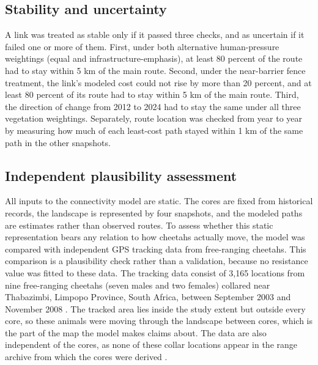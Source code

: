 \subsection{Stability and uncertainty}
\label{sec:uncertainty}

A link was treated as stable only if it passed three checks, and as uncertain if it failed one or more of them. First, under both alternative human-pressure weightings (equal and infrastructure-emphasis), at least 80 percent of the route had to stay within 5 km of the main route. Second, under the near-barrier fence treatment, the link's modeled cost could not rise by more than 20 percent, and at least 80 percent of its route had to stay within 5 km of the main route. Third, the direction of change from 2012 to 2024 had to stay the same under all three vegetation weightings. Separately, route location was checked from year to year by measuring how much of each least-cost path stayed within 1 km of the same path in the other snapshots.

\subsection{Independent plausibility assessment}
\label{sec:validation}

All inputs to the connectivity model are static. The cores are fixed from historical records, the landscape is represented by four snapshots, and the modeled paths are estimates rather than observed routes. To assess whether this static representation bears any relation to how cheetahs actually move, the model was compared with independent GPS tracking data from free-ranging cheetahs. This comparison is a plausibility check rather than a validation, because no resistance value was fitted to these data. The tracking data consist of 3,165 locations from nine free-ranging cheetahs (seven males and two females) collared near Thabazimbi, Limpopo Province, South Africa, between September 2003 and November 2008 \parencite{marnewick2017ewtdata, marnewick2017tracking}. The tracked area lies inside the study extent but outside every core, so these animals were moving through the landscape between cores, which is the part of the map the model makes claims about. The data are also independent of the cores, as none of these collar locations appear in the range archive from which the cores were derived \parencite{weise2017data}.

